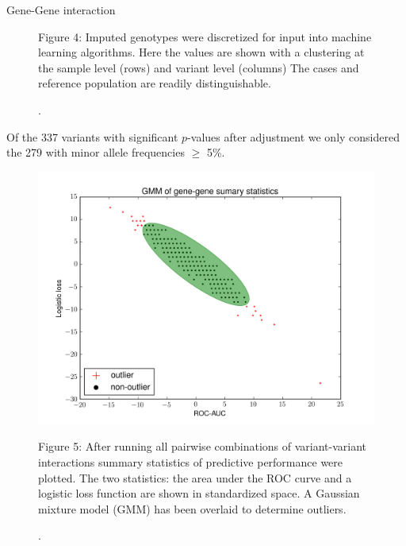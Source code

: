 \documentclass[final]{beamer}
\newlength{\onecolwid}
\begin{document}
\begin{frame}[t]
\begin{columns}[t]
\begin{column}{\onecolwid}
\begin{block}{Gene-Gene interaction}
{\begin{figure}
\begin{center}
            \end{center}
            \begin{flushleft}\small{\color{darkblue}Figure 4: \color{black} Imputed genotypes were discretized for input into machine learning algorithms.  Here the values are shown with a clustering at the sample level (rows) and variant level (columns)  The cases and reference population are readily distinguishable.
            }\end{flushleft}.
            \label{fig:heatmap} 
            \end{figure} 
            
	Of the 337 variants with significant $p$-values after adjustment we only considered the 279 with minor allele frequencies $\geq$ 5\%.
        \begin{figure}
            \begin{center}
              \includegraphics[width=6in]{./figs/gg-results-scatter.png}
            \end{center}
            \begin{flushleft}\small{\color{darkblue}Figure 5: \color{black} After running all pairwise combinations of variant-variant interactions summary statistics of predictive performance were plotted.  The two statistics: the area under the ROC curve and a logistic loss function are shown in standardized space.  A Gaussian mixture model (GMM) has been overlaid to determine outliers.}\end{flushleft}.
            \label{fig:application} 
            \end{figure} 
           }  
           

\end{block}
\end{column}
\end{columns}
\end{frame}
\end{document}
